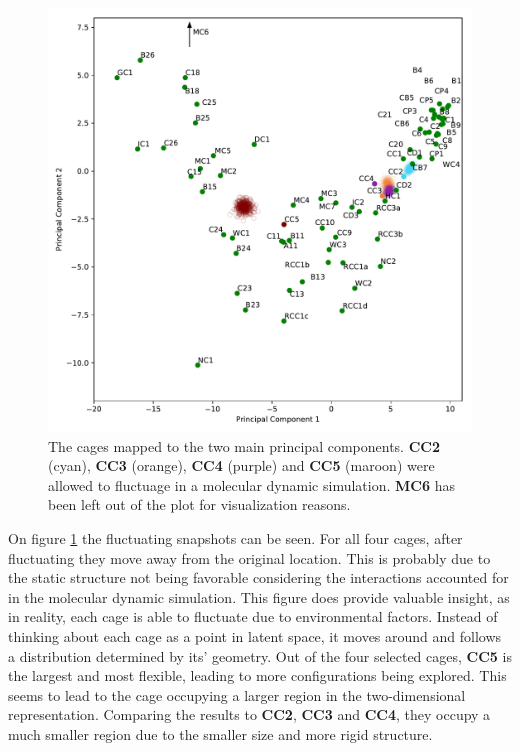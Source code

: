 \documentclass[journal=jacsat,manuscript=article]{achemso}
\begin{document}
\begin{figure}
\centering
	\includegraphics[width=\columnwidth]{../PCA_latent_cage_space_with_flexible_cages_2D.pdf}
	\caption{The cages mapped to the two main principal components. \textbf{CC2} (cyan), \textbf{CC3} (orange), \textbf{CC4} (purple) and \textbf{CC5} (maroon) were allowed to fluctuage in a molecular dynamic simulation. \textbf{MC6} has been left out of the plot for visualization reasons.
	} \label{fig:pca_space_with_flex}
\end{figure}

On figure \ref{fig:pca_space_with_flex} the fluctuating snapshots can be seen. For all four cages, after fluctuating they move away from the original location. This is probably due to the static structure not being favorable considering the interactions accounted for in the molecular dynamic simulation. This figure does provide valuable insight, as in reality, each cage is able to fluctuate due to environmental factors. Instead of thinking about each cage as a point in latent space, it moves around and follows a distribution determined by its' geometry. Out of the four selected cages, \textbf{CC5} is the largest and most flexible, leading to more configurations being explored. This seems to lead to the cage occupying a larger region in the two-dimensional representation. Comparing the results to \textbf{CC2}, \textbf{CC3} and \textbf{CC4}, they occupy a much smaller region due to the smaller size and more rigid structure.
\end{document}
